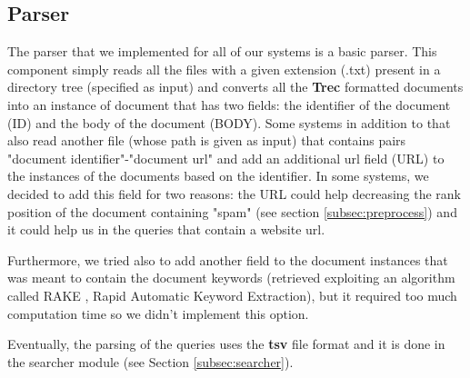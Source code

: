 \subsection{Parser}
\label{subsec:parser}
The parser that we implemented for all of our systems is a basic parser. This component simply reads all the files with a given extension (.txt) present in a directory tree (specified as input) and converts all the \textbf{Trec} formatted documents into an instance of document that has two fields: the identifier of the document (ID) and the body of the document (BODY). Some systems in addition to that also read another file (whose path is given as input) that contains pairs "document identifier"-"document url" and add an additional url field (URL) to the instances of the documents based on the identifier. In some systems, we decided to add this field for two reasons: the URL could help decreasing the rank position of the document containing "spam" (see section \ref{subsec:preprocess}) and it could help us in the queries that contain a website url.
\par
Furthermore, we tried also to add another field to the document instances that was meant to contain the document keywords (retrieved exploiting an algorithm called RAKE \cite{rake}, Rapid Automatic Keyword Extraction), but it required too much computation time so we didn't implement this option.
\par
Eventually, the parsing of the queries uses the \textbf{tsv} file format and it is done in the searcher module (see Section \ref{subsec:searcher}).

